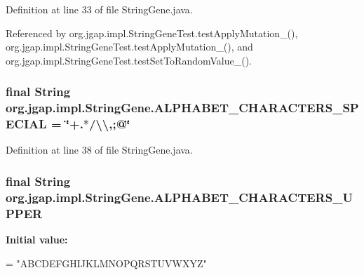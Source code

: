 Definition at line 33 of file String\-Gene.\-java.



Referenced by org.\-jgap.\-impl.\-String\-Gene\-Test.\-test\-Apply\-Mutation\-\_(), org.\-jgap.\-impl.\-String\-Gene\-Test.\-test\-Apply\-Mutation\-\_(), and org.\-jgap.\-impl.\-String\-Gene\-Test.\-test\-Set\-To\-Random\-Value\-\_().

\hypertarget{classorg_1_1jgap_1_1impl_1_1_string_gene_a48fcfb4a136db00befab3fd737f151b1}{
\subsubsection[{A\-L\-P\-H\-A\-B\-E\-T\-\_\-\-C\-H\-A\-R\-A\-C\-T\-E\-R\-S\-\_\-\-S\-P\-E\-C\-I\-A\-L}]{\setlength{\rightskip}{0pt plus 5cm}final String org.\-jgap.\-impl.\-String\-Gene.\-A\-L\-P\-H\-A\-B\-E\-T\-\_\-\-C\-H\-A\-R\-A\-C\-T\-E\-R\-S\-\_\-\-S\-P\-E\-C\-I\-A\-L = \char`\"{}+.$\ast$/\textbackslash{}\textbackslash{},;@\char`\"{}\hspace{0.3cm}{\ttfamily [static]}}}\label{classorg_1_1jgap_1_1impl_1_1_string_gene_a48fcfb4a136db00befab3fd737f151b1}


Definition at line 38 of file String\-Gene.\-java.

\hypertarget{classorg_1_1jgap_1_1impl_1_1_string_gene_a2da04c8cdfd00b3b7223ccf9e4bd0fad}{
\subsubsection[{A\-L\-P\-H\-A\-B\-E\-T\-\_\-\-C\-H\-A\-R\-A\-C\-T\-E\-R\-S\-\_\-\-U\-P\-P\-E\-R}]{\setlength{\rightskip}{0pt plus 5cm}final String org.\-jgap.\-impl.\-String\-Gene.\-A\-L\-P\-H\-A\-B\-E\-T\-\_\-\-C\-H\-A\-R\-A\-C\-T\-E\-R\-S\-\_\-\-U\-P\-P\-E\-R\hspace{0.3cm}{\ttfamily [static]}}}\label{classorg_1_1jgap_1_1impl_1_1_string_gene_a2da04c8cdfd00b3b7223ccf9e4bd0fad}
{\bfseries Initial value\-:}
\begin{DoxyCode}
=
      \textcolor{stringliteral}{"ABCDEFGHIJKLMNOPQRSTUVWXYZ"}
\end{DoxyCode}


